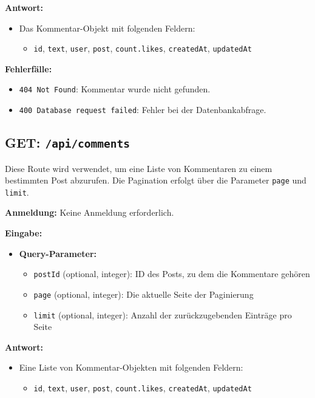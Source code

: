 \documentclass[a4paper,12pt]{article}
\begin{document}
\textbf{Antwort:}
\begin{itemize}
    \item Das Kommentar-Objekt mit folgenden Feldern:
    \begin{itemize}
        \item \texttt{id},
              \texttt{text},
              \texttt{user},
              \texttt{post},
              \texttt{count.likes},
              \texttt{createdAt},
              \texttt{updatedAt}
    \end{itemize}
\end{itemize}

\textbf{Fehlerfälle:}
\begin{itemize}
    \item \texttt{404 Not Found}:
        Kommentar wurde nicht gefunden.
    \item \texttt{400 Database request failed}:
        Fehler bei der Datenbankabfrage.
\end{itemize}

\subsection{GET: \texttt{/api/comments}}

Diese Route wird verwendet, um eine Liste von Kommentaren zu einem bestimmten
Post abzurufen. Die Pagination erfolgt über die Parameter \texttt{page} und
\texttt{limit}.

\textbf{Anmeldung:} Keine Anmeldung erforderlich.

\textbf{Eingabe:}
\begin{itemize}
    \item \textbf{Query-Parameter:}
    \begin{itemize}
        \item \texttt{postId} (optional, integer):
            ID des Posts, zu dem die Kommentare gehören
        \item \texttt{page} (optional, integer):
            Die aktuelle Seite der Paginierung
        \item \texttt{limit} (optional, integer):
            Anzahl der zurückzugebenden Einträge pro Seite
    \end{itemize}
\end{itemize}

\textbf{Antwort:}
\begin{itemize}
    \item Eine Liste von Kommentar-Objekten mit folgenden Feldern:
    \begin{itemize}
        \item \texttt{id},
              \texttt{text},
              \texttt{user},
              \texttt{post},
              \texttt{count.likes},
              \texttt{createdAt},
              \texttt{updatedAt}
    \end{itemize}
\end{itemize}
\end{document}
